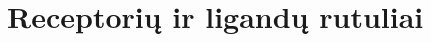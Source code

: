 \documentclass[10pt]{article}
\begin{document}
%

\section{Receptorių ir ligandų rutuliai}


\end{document}
